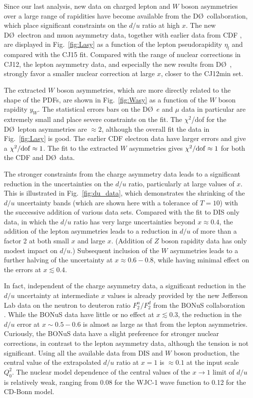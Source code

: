 \documentclass[aps,prd,amsmath,preprint]{revtex4}
\begin{document}
Since our last analysis, new data on charged lepton \cite{D0_mu,
D0_e} and $W$ boson asymmetries \cite{D0_W} over a large range
of rapidities have become available from the D\O\ collaboration,
which place significant constraints on the $d/u$ ratio at high $x$.
The new D\O\ electron and muon asymmetry data, together with earlier
data from CDF \cite{CDF_e}, are displayed in Fig.~\ref{fig:Lasy}
as a function of the lepton pseudorapidity $\eta_l$ and compared
with the CJ15 fit.
Compared with the range of nuclear corrections in CJ12, the
lepton asymmetry data, and especially the new results from
D\O\ \cite{D0_mu, D0_e}, strongly favor a smaller nuclear
correction at large $x$, closer to the CJ12min set.


The extracted $W$ boson asymmetries, which are more directly
related to the shape of the PDFs, are shown in Fig.~\ref{fig:Wasy}
as a function of the $W$ boson rapidity $y_W$.  The statistical
errors bars on the D\O\ $e$ and $\mu$ data in particular are
extremely small and place severe constraints on the fit.
The $\chi^2$/dof for the D\O\ lepton asymmetries are $\approx 2$,
although the overall fit the data in Fig.~\ref{fig:Lasy} is good.
The earlier CDF electron data have larger errors and give a
$\chi^2/{\rm dof} \approx 1$.  The fit to the extracted $W$
asymmetries gives $\chi^2/{\rm dof} \approx 1$ for both the CDF
and D\O\ data.


The stronger constraints from the charge asymmetry data leads to
a significant reduction in the uncertainties on the $d/u$ ratio,
particularly at large values of $x$.  This is illustrated in
Fig.~\ref{fig:du_data}, which demonstrates the shrinking of the
$d/u$ uncertainty bands (which are shown here with a tolerance
of $T=10$) with the successive addition of various data sets.
Compared with the fit to DIS only data, in which the $d/u$ ratio
has very large uncertainties beyond $x \approx 0.4$, the addition
of the lepton asymmetries leads to a reduction in $d/u$ of more
than a factor 2 at both small $x$ and large $x$.
(Addition of $Z$ boson rapidity data \cite{CDFZ, D0Z} has only
modest impact on $d/u$.)
Subsequent inclusion of the $W$ asymmetries leads to a further
halving of the uncertainty at $x \approx 0.6-0.8$, while having
minimal effect on the errors at $x \lesssim 0.4$.


In fact, independent of the charge asymmetry data, a significant
reduction in the $d/u$ uncertainty at intermediate $x$ values is
already provided by the new Jefferson Lab data on the neutron to
deuteron ratio $F_2^n/F_2^d$ from the BONuS collaboration
\cite{BONuS}.  While the BONuS data have little or no effect
at $x \lesssim 0.3$, the reduction in the $d/u$ error at
$x \sim 0.5-0.6$ is almost as large as that from the lepton
asymmetries.
%
Curiously, the BONuS data have a slight preference for stronger
nuclear corrections, in contrast to the lepton asymmetry data,
although the tension is not significant.
%
Using all the available data from DIS and $W$ boson production,
the central value of the extrapolated $d/u$ ratio at $x=1$
is $\approx 0.1$ at the input scale $Q_0^2$.
The nuclear model dependence of the central values of the
$x \to 1$ limit of $d/u$ is relatively weak, ranging from 0.08
for the WJC-1 wave function to 0.12 for the CD-Bonn model.
\end{document}
